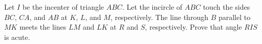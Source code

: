 Let $I$ be the incenter of triangle $ABC$.
Let the incircle of $ABC$ touch
the sides $BC$, $CA$, and $AB$ at $K$, $L$, and $M$, respectively.
The line through $B$ parallel to $MK$ meets the lines
$LM$ and $LK$ at $R$ and $S$, respectively.
Prove that angle $RIS$ is acute.
